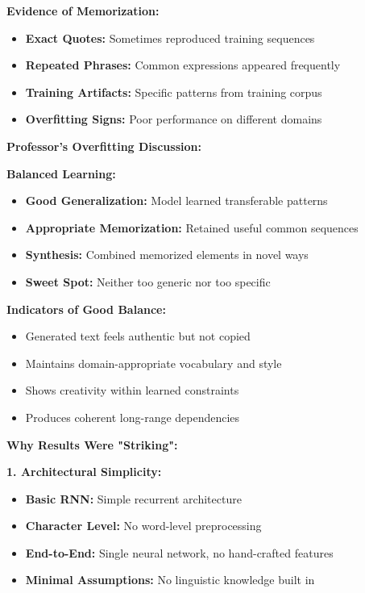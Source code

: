 \documentclass[12pt]{article}
\begin{document}
\begin{enumerate}[(a)]
{    \textbf{Evidence of Memorization:}
    \begin{itemize}
        \item \textbf{Exact Quotes:} Sometimes reproduced training sequences
        \item \textbf{Repeated Phrases:} Common expressions appeared frequently
        \item \textbf{Training Artifacts:} Specific patterns from training corpus
        \item \textbf{Overfitting Signs:} Poor performance on different domains
    \end{itemize}
    
    \textbf{Professor's Overfitting Discussion:}
    
    \textbf{Balanced Learning:}
    \begin{itemize}
        \item \textbf{Good Generalization:} Model learned transferable patterns
        \item \textbf{Appropriate Memorization:} Retained useful common sequences
        \item \textbf{Synthesis:} Combined memorized elements in novel ways
        \item \textbf{Sweet Spot:} Neither too generic nor too specific
    \end{itemize}
    
    \textbf{Indicators of Good Balance:}
    \begin{itemize}
        \item Generated text feels authentic but not copied
        \item Maintains domain-appropriate vocabulary and style
        \item Shows creativity within learned constraints
        \item Produces coherent long-range dependencies
    \end{itemize}
    
    \textbf{Why Results Were "Striking":}
    
    \textbf{1. Architectural Simplicity:}
    \begin{itemize}
        \item \textbf{Basic RNN:} Simple recurrent architecture
        \item \textbf{Character Level:} No word-level preprocessing
        \item \textbf{End-to-End:} Single neural network, no hand-crafted features
        \item \textbf{Minimal Assumptions:} No linguistic knowledge built in
    \end{itemize}
    
}
\end{enumerate}
\end{document}
